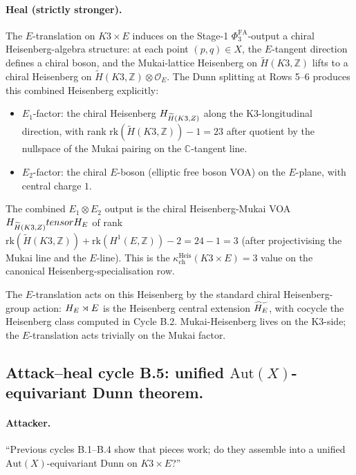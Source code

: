 \documentclass[11pt]{article}
\newcommand{\Eone}{E_{1}}
\newcommand{\Etwo}{E_{2}}
\newcommand{\PhiFA}{\Phi^{\mathrm{FA}}}
\newcommand{\C}{\mathbb{C}}
\newcommand{\Z}{\mathbb{Z}}
\newcommand{\cO}{\mathcal{O}}
\newcommand{\Aut}{\mathrm{Aut}}
\begin{document}
\paragraph{Heal (strictly stronger).}
The $E$-translation on $K3 \times E$ induces on the Stage-1
$\PhiFA_3$-output a chiral Heisenberg-algebra structure: at each point
$(p, q) \in X$, the $E$-tangent direction defines a chiral boson, and the
Mukai-lattice Heisenberg on $\widetilde H(K3, \Z)$ lifts to a chiral
Heisenberg on $\widetilde H(K3, \Z) \otimes \cO_E$. The Dunn splitting
at Rows 5--6 produces this combined Heisenberg explicitly:
\begin{itemize}
\item $\Eone$-factor: the chiral Heisenberg $\cH_{\widetilde H(K3, \Z)}$
  along the K3-longitudinal direction, with rank $\mathrm{rk}(\widetilde
  H(K3, \Z)) - 1 = 23$ after quotient by the nullspace of the
  Mukai pairing on the $\C$-tangent line.
\item $\Etwo$-factor: the chiral $E$-boson (elliptic free boson VOA)
  on the $E$-plane, with central charge $1$.
\end{itemize}
The combined $\Eone \otimes \Etwo$ output is the chiral Heisenberg-Mukai
VOA $\cH_{\widetilde H(K3, \Z)} \otimes \cH_E$ of rank
$\mathrm{rk}(\widetilde H(K3, \Z)) + \mathrm{rk}(H^1(E, \Z)) - 2 = 24 - 1 = 3$
(after projectivising the Mukai line and the $E$-line). This is the
$\kappa_{\mathrm{ch}}^{\mathrm{Heis}}(K3 \times E) = 3$ value on the
canonical Heisenberg-specialisation row.

The $E$-translation acts on this Heisenberg by the standard chiral
Heisenberg-group action: $H_E \rtimes E$ is the Heisenberg central
extension $\widetilde{H_E}$, with cocycle the Heisenberg class
computed in Cycle B.2. Mukai-Heisenberg lives on the K3-side; the
$E$-translation acts trivially on the Mukai factor.

\subsection{Attack--heal cycle B.5: unified $\Aut(X)$-equivariant Dunn
  theorem.}

\paragraph{Attacker.}
``Previous cycles B.1--B.4 show that pieces work; do they assemble into a
unified $\Aut(X)$-equivariant Dunn on $K3 \times E$?''
\end{document}
